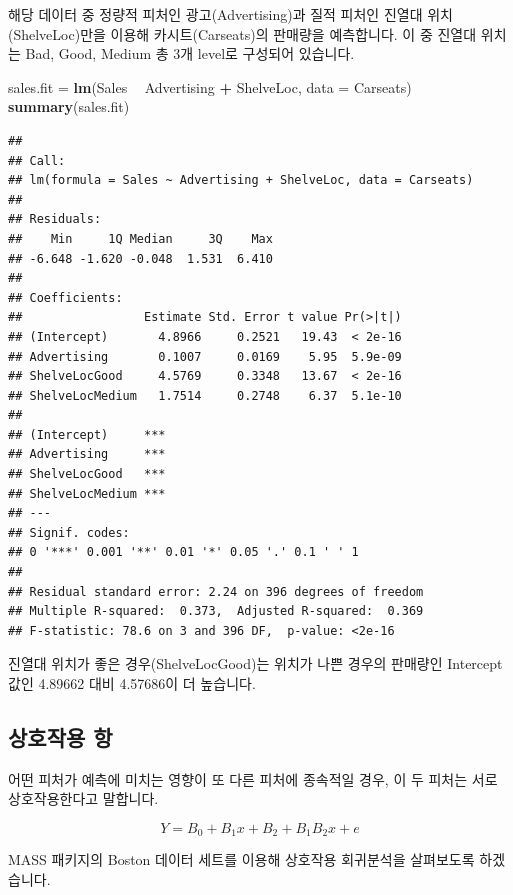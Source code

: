 \documentclass[12pt,]{book}
\newenvironment{Shaded}{\begin{snugshade}}{\end{snugshade}}
\newcommand{\DataTypeTok}[1]{\textcolor[rgb]{0.13,0.29,0.53}{#1}}
\newcommand{\KeywordTok}[1]{\textcolor[rgb]{0.13,0.29,0.53}{\textbf{#1}}}
\newcommand{\NormalTok}[1]{#1}
\newcommand{\OperatorTok}[1]{\textcolor[rgb]{0.81,0.36,0.00}{\textbf{#1}}}
\newcommand{\StringTok}[1]{\textcolor[rgb]{0.31,0.60,0.02}{#1}}
\begin{document}
해당 데이터 중 정량적 피처인 광고(Advertising)과 질적 피처인 진열대 위치(ShelveLoc)만을 이용해 카시트(Carseats)의 판매량을 예측합니다. 이 중 진열대 위치는 Bad, Good, Medium 총 3개 level로 구성되어 있습니다.

\begin{Shaded}
\begin{Highlighting}[]
\NormalTok{sales.fit =}\StringTok{ }\KeywordTok{lm}\NormalTok{(Sales }\OperatorTok{~}\StringTok{ }\NormalTok{Advertising }\OperatorTok{+}\StringTok{ }\NormalTok{ShelveLoc, }\DataTypeTok{data =}\NormalTok{ Carseats)}
\KeywordTok{summary}\NormalTok{(sales.fit)}
\end{Highlighting}
\end{Shaded}

\begin{verbatim}
## 
## Call:
## lm(formula = Sales ~ Advertising + ShelveLoc, data = Carseats)
## 
## Residuals:
##    Min     1Q Median     3Q    Max 
## -6.648 -1.620 -0.048  1.531  6.410 
## 
## Coefficients:
##                 Estimate Std. Error t value Pr(>|t|)
## (Intercept)       4.8966     0.2521   19.43  < 2e-16
## Advertising       0.1007     0.0169    5.95  5.9e-09
## ShelveLocGood     4.5769     0.3348   13.67  < 2e-16
## ShelveLocMedium   1.7514     0.2748    6.37  5.1e-10
##                    
## (Intercept)     ***
## Advertising     ***
## ShelveLocGood   ***
## ShelveLocMedium ***
## ---
## Signif. codes:  
## 0 '***' 0.001 '**' 0.01 '*' 0.05 '.' 0.1 ' ' 1
## 
## Residual standard error: 2.24 on 396 degrees of freedom
## Multiple R-squared:  0.373,  Adjusted R-squared:  0.369 
## F-statistic: 78.6 on 3 and 396 DF,  p-value: <2e-16
\end{verbatim}

진열대 위치가 좋은 경우(ShelveLocGood)는 위치가 나쁜 경우의 판매량인 Intercept 값인 4.89662 대비 4.57686이 더 높습니다.

\hypertarget{uxc0c1uxd638uxc791uxc6a9-uxd56d}{%
\subsection{상호작용 항}\label{uxc0c1uxd638uxc791uxc6a9-uxd56d}}

어떤 피처가 예측에 미치는 영향이 또 다른 피처에 종속적일 경우, 이 두 피처는 서로 상호작용한다고 말합니다.

\[Y = B_0 + B_1x + B_2 + B_1B_2x + e\]

MASS 패키지의 Boston 데이터 세트를 이용해 상호작용 회귀분석을 살펴보도록 하겠습니다.
\end{document}
